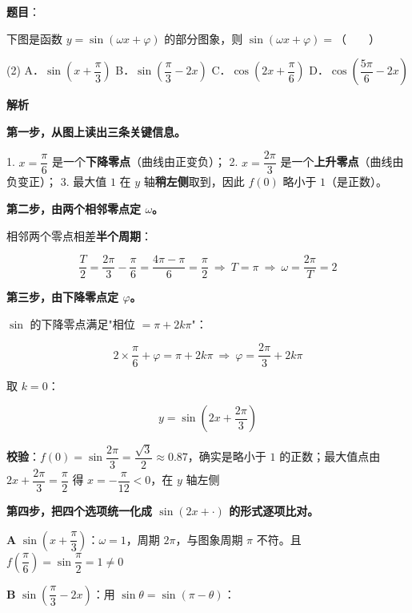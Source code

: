 \begin{answer}

\textbf{题目}：

下图是函数 $y=\sin(\omega x+\varphi)$ 的部分图象，则 $\sin(\omega x+\varphi)=$\mbox{（　　）}
\nopagebreak[4]
\begin{center}\end{center}
\nopagebreak[4]
\begin{gkopts}(2)
\task A．$\sin\left(x+\dfrac\pi3\right)$
\task B．$\sin\left(\dfrac\pi3-2x\right)$
\task C．$\cos\left(2x+\dfrac\pi6\right)$
\task D．$\cos\left(\dfrac{5\pi}6-2x\right)$
\end{gkopts}

\textbf{解析}

\textbf{第一步，从图上读出三条关键信息。}

1. $x=\dfrac\pi6$ 是一个\textbf{下降零点}（曲线由正变负）；
2. $x=\dfrac{2\pi}3$ 是一个\textbf{上升零点}（曲线由负变正）；
3. 最大值 $1$ 在 $y$ 轴\textbf{稍左侧}取到，因此 $f(0)$ 略小于 $1$（是正数）。

\textbf{第二步，由两个相邻零点定 $\omega$。}

相邻两个零点相差\textbf{半个周期}：

\nopagebreak[4]
\[\frac T2=\frac{2\pi}3-\frac\pi6=\frac{4\pi-\pi}6=\frac\pi2\ \Longrightarrow\ T=\pi\ \Longrightarrow\ \omega=\frac{2\pi}T=2\]

\textbf{第三步，由下降零点定 $\varphi$。}

$\sin$ 的下降零点满足"相位 $=\pi+2k\pi$"：

\nopagebreak[4]
\[2\times\frac\pi6+\varphi=\pi+2k\pi\ \Longrightarrow\ \varphi=\frac{2\pi}3+2k\pi\]

取 $k=0$：

\nopagebreak[4]
\[y=\sin\left(2x+\frac{2\pi}3\right)\]

\textbf{校验}：$f(0)=\sin\dfrac{2\pi}3=\dfrac{\sqrt3}2\approx0.87$，确实是略小于 $1$ 的正数；最大值点由 $2x+\dfrac{2\pi}3=\dfrac\pi2$ 得 $x=-\dfrac\pi{12}<0$，在 $y$ 轴左侧 

\textbf{第四步，把四个选项统一化成 $\sin(2x+\cdot)$ 的形式逐项比对。}

\textbf{A} $\sin\left(x+\dfrac\pi3\right)$：$\omega=1$，周期 $2\pi$，与图象周期 $\pi$ 不符。且 $f\left(\dfrac\pi6\right)=\sin\dfrac\pi2=1\ne0$ 

\textbf{B} $\sin\left(\dfrac\pi3-2x\right)$：用 $\sin\theta=\sin(\pi-\theta)$：


\end{answer}
